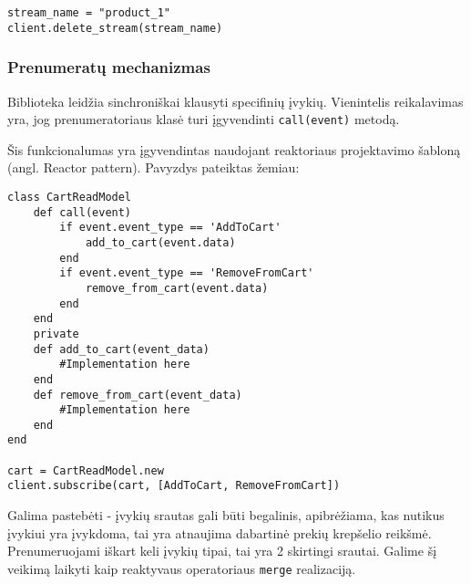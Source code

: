 \begin{lstlisting}
stream_name = "product_1"
client.delete_stream(stream_name)
\end{lstlisting}

\subsubsection{Prenumeratų mechanizmas}

Biblioteka leidžia sinchroniškai klausyti specifinių įvykių. Vienintelis reikalavimas yra, jog prenumeratoriaus klasė turi įgyvendinti \lstinline|call(event)| metodą.

Šis funkcionalumas yra įgyvendintas naudojant reaktoriaus projektavimo šabloną (angl. Reactor pattern). Pavyzdys pateiktas žemiau:

\begin{lstlisting}
class CartReadModel
    def call(event)
        if event.event_type == 'AddToCart'
            add_to_cart(event.data)
        end
        if event.event_type == 'RemoveFromCart'
            remove_from_cart(event.data)
        end
    end
    private
    def add_to_cart(event_data)
        #Implementation here
    end
    def remove_from_cart(event_data)
        #Implementation here
    end 
end
 
cart = CartReadModel.new
client.subscribe(cart, [AddToCart, RemoveFromCart]) 
\end{lstlisting}

Galima pastebėti - įvykių srautas gali būti begalinis, apibrėžiama, kas nutikus įvykiui yra įvykdoma, tai yra atnaujima dabartinė prekių krepšelio reikšmė. Prenumeruojami iškart keli įvykių tipai, tai yra 2 skirtingi srautai. Galime šį veikimą laikyti kaip reaktyvaus operatoriaus \lstinline|merge| realizaciją.




